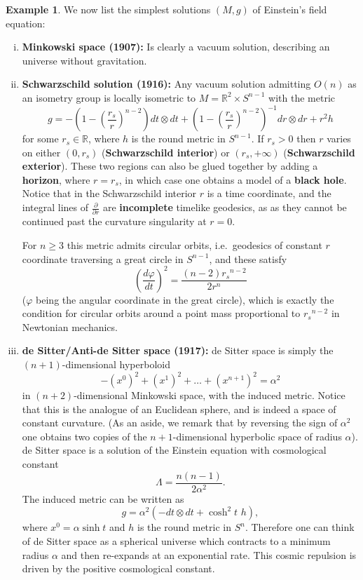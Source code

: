 \documentclass[10pt]{amsart}
\newcommand{\bbR}{\mathbb{R}}      %
\theoremstyle{definition}
\newtheorem{Example}[Thm]{Example}
\theoremstyle{remark}
\begin{document}
\begin{Example} \label{spacetimes}
We now list the simplest solutions $(M,g)$ of Einstein's field equation:
\begin{enumerate}[(i)]
\item
{\bf Minkowski space (1907):} Is clearly a vacuum solution, describing an universe without gravitation.
\item
{\bf Schwarzschild solution (1916):} Any vacuum solution admitting $O(n)$ as an isometry group is locally isometric to $M=\bbR^2 \times S^{n-1}$ with the metric
\[
g = - \left( 1 - \left(\frac{r_s}{r}\right)^{n-2} \right) dt \otimes dt + \left( 1 - \left(\frac{r_s}{r}\right)^{n-2} \right)^{-1} dr \otimes dr + r^2 h
\]
for some $r_s \in \bbR$, where $h$ is the round metric in $S^{n-1}$. If $r_s > 0$ then $r$ varies on either $(0,r_s)$ ({\bf Schwarzschild interior}) or $(r_s,+\infty)$ ({\bf Schwarzschild exterior}). These two regions can also be glued together by adding a {\bf horizon}, where $r=r_s$, in which case one obtains a model of a {\bf black hole}. Notice that in the Schwarzschild interior $r$ is a time coordinate, and the integral lines of $\frac{\partial}{\partial r}$ are {\bf incomplete} timelike geodesics, as as they cannot be continued past the curvature singularity at $r=0$.

For $n \geq 3$ this metric admits circular orbits, i.e.~geodesics of constant $r$ coordinate traversing a great circle in $S^{n-1}$, and these satisfy
\[
\left( \frac{d\varphi}{dt} \right)^2 = \frac{(n-2){r_s}^{n-2}}{2r^n}
\]
($\varphi$ being the angular coordinate in the great circle), which is exactly the condition for circular orbits around a point mass proportional to ${r_s}^{n-2}$ in Newtonian mechanics.
\item
{\bf de Sitter/Anti-de Sitter space (1917):} de Sitter space is simply the $(n+1)$-dimensional hyperboloid
\[
-(x^0)^2 + (x^1)^2 + \ldots + (x^{n+1})^2 = \alpha^2
\]
in $(n+2)$-dimensional Minkowski space, with the induced metric. Notice that this is the analogue of an Euclidean sphere, and is indeed a space of constant curvature. (As an aside, we remark that by reversing the sign of $\alpha^2$ one obtains two copies of the $n+1$-dimensional hyperbolic space of radius $\alpha$). de Sitter space is a solution of the Einstein equation with cosmological constant 
\[
\Lambda=\frac{n(n-1)}{2\alpha^2}.
\]
The induced metric can be written as
\[
g = \alpha^2 \left( - dt \otimes dt + \cosh^2 t \,\, h \right),
\]
where $x^0=\alpha\sinh t$ and $h$ is the round metric in $S^n$. Therefore one can think of de Sitter space as a spherical universe which contracts to a minimum radius $\alpha$ and then re-expands at an exponential rate. This cosmic repulsion is driven by the positive cosmological constant.


\end{enumerate}
\end{Example}
\end{document}
